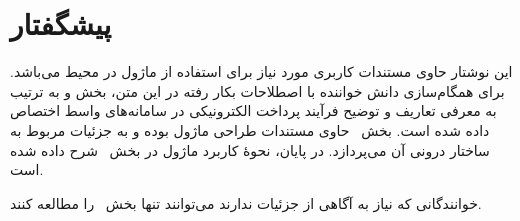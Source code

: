 \section*{پیشگفتار}
این نوشتار حاوی مستندات کاربری مورد نیاز برای استفاده
از ماژول  در محیط  می‌باشد. برای همگام‌سازی
دانش خواننده با اصطلاحات بکار رفته در این متن، بخش
 و 
به ترتیب به معرفی تعاریف و توضیح فرآیند پرداخت
الکترونیکی در سامانه‌های واسط اختصاص داده شده است.
بخش~ حاوی مستندات طراحی
ماژول  بوده و به جزئیات مربوط به
ساختار درونی آن می‌پردازد.
در پایان، نحوهٔ کاربرد ماژول 
در بخش~ شرح داده شده است.

خوانندگانی که نیاز به آگاهی از جزئیات ندارند می‌توانند
تنها بخش~ را مطالعه کنند.

